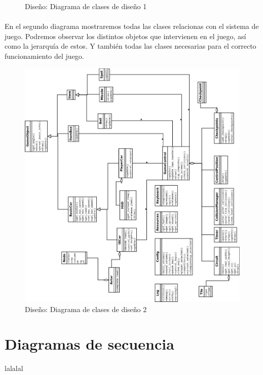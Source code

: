 \begin{figure}[H]
\begin{center}
  \end{center}
  \caption{Diseño: Diagrama de clases de diseño 1}
\end{figure}

\paragraph{}
En el segundo diagrama mostraremos todas las clases relacionas con el sistema de juego. Podremos observar los distintos objetos que
intervienen en el juego, así como la jerarquía de estos. Y también todas las clases necesarias para el correcto funcionamiento del
juego.

\begin{figure}[H]
  \label{diagrama_clases_diseno}
  \begin{center}
    \includegraphics[scale=0.45]{imagenes/diseno/diagrama_clases_diseno2.png}
  \end{center}
  \caption{Diseño: Diagrama de clases de diseño 2}
\end{figure}

\section{Diagramas de secuencia}
lalalal
